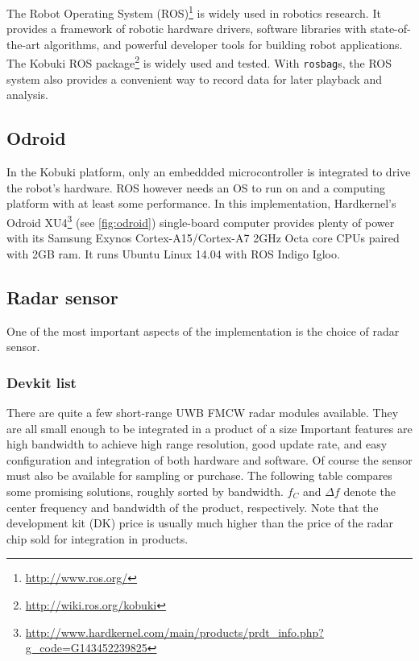 The Robot Operating System (ROS)\footnote{\url{http://www.ros.org/}} is widely used in robotics research. It provides a framework of robotic hardware drivers, software libraries with state-of-the-art algorithms, and powerful developer tools for building robot applications. The Kobuki ROS package\footnote{\url{http://wiki.ros.org/kobuki}} is widely used and tested. With \texttt{rosbag}s, the ROS system also provides a convenient way to record data for later playback and analysis.

\subsection{Odroid}\label{odroid}

In the Kobuki platform, only an embeddded microcontroller is integrated to drive the robot's hardware. ROS however needs an OS to run on and a computing platform with at least some performance. In this implementation, Hardkernel's Odroid XU4\footnote{\url{http://www.hardkernel.com/main/products/prdt_info.php?g_code=G143452239825}} (see \cref{fig:odroid}) single-board computer provides plenty of power with its Samsung Exynos Cortex-A15/Cortex-A7 2GHz Octa core CPUs paired with 2GB ram. It runs Ubuntu Linux 14.04 with ROS Indigo Igloo.

\subsection{Radar sensor}\label{radar-sensor}

One of the most important aspects of the implementation is the choice of radar sensor.

\subsubsection{Devkit list}\label{devkit-list}

There are quite a few short-range UWB FMCW radar modules available. They are all small enough to be integrated in a product of a size Important features are high bandwidth to achieve high range resolution, good update rate, and easy configuration and integration of both hardware and software. Of course the sensor must also be available for sampling or purchase. The following table compares some promising solutions, roughly sorted by bandwidth. $f_C$ and $\Delta f$ denote the center frequency and bandwidth of the product, respectively. Note that the development kit (DK) price is usually much higher than the price of the radar chip sold for integration in products.

